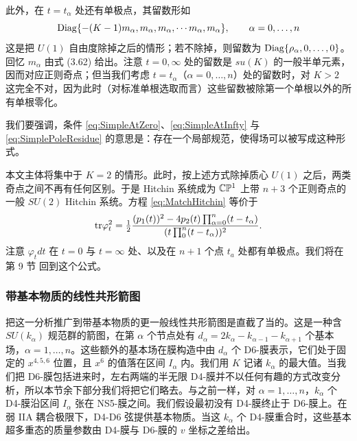 此外，在 $t=t_\alpha$ 处还有单极点，其留数形如
\begin{equation}\label{eq:SimplePoleResidue}
{\rm Diag}\{-(K-1) m_\alpha, m_\alpha,m_\alpha,\cdots m_\alpha,m_\alpha \}  ,\qquad \alpha =
0, \dots, n
\end{equation}
这是把 $U(1)$ 自由度除掉之后的情形；若不除掉，则留数为 ${\rm Diag}\{\rho_\alpha, 0,\dots, 0 \}$。回忆 $m_\alpha$ 由式 (3.62)%
给出。注意 $t=0, \infty$ 处的留数是 $su(K)$ 的一般半单元素，因而对应正则奇点；但当我们考虑 $t=t_\alpha$（$\alpha = 0, \dots, n$）处的留数时，对 $K>2$ 这完全不对，因为此时（对标准单根选取而言）这些留数被除第一个单根以外的所有单根零化。

我们要强调，条件 \eqref{eq:SimpleAtZero}、\eqref{eq:SimpleAtInfty} 与 \eqref{eq:SimplePoleResidue} 的意思是：存在一个局部规范，使得场可以被写成这种形式。

本文主体将集中于 $K=2$ 的情形。此时，按上述方式除掉质心 $U(1)$ 之后，两类奇点之间不再有任何区别。于是 Hitchin 系统成为 $\mathbb{C} \mathbb{P}^1$ 上带 $n+3$ 个正则奇点的一般 $SU(2)$ Hitchin 系统。方程 \eqref{eq:MatchHitchin} 等价于
\begin{equation}\label{eq:su2exple}
{\rm tr} \varphi_t^2 = \tfrac{1}{2} \frac{ (p_1(t))^2 - 4 p_2(t)
\prod_{\alpha=0}^n (t-t_\alpha) }{(t \prod_0^n (t-t_\alpha))^2}.
\end{equation}
注意 $\varphi_t dt$ 在 $t = 0$ 与 $t = \infty$ 处、以及在 $n+1$ 个点 $t_a$ 处都有单极点。我们将在第 9 节%
回到这个公式。

\subsubsection{带基本物质的线性共形箭图}
\label{subsubsec:LinConfQuivMatt}

把这一分析推广到带基本物质的更一般线性共形箭图是直截了当的。这是一种含 $SU(k_\alpha)$ 规范群的箭图，在第 $\alpha$ 个节点处有 $d_\alpha = 2 k_\alpha - k_{\alpha-1} - k_{\alpha + 1}$ 个基本场，$\alpha = 1, \dots, n$。这些额外的基本场在膜构造中由 $d_\alpha$ 个 D6-膜表示，它们处于固定的 $x^{4,5,6}$ 位置，且 $x^6$ 的值落在区间 $I_\alpha$ 内。我们用 $K$ 记诸 $k_\alpha$ 的最大值。当我们把 D6-膜包括进来时，左右两端的半无限 D4-膜并不以任何有趣的方式改变分析，所以本节余下部分我们将把它们略去。与之前一样，对 $\alpha =1,\dots, n$，$k_\alpha$ 个 D4-膜沿区间 $I_\alpha$ 张在 NS5-膜之间。我们假设最初没有 D4-膜终止于 D6-膜上。在弱 IIA 耦合极限下，D4-D6 弦提供基本物质。当这 $k_\alpha$ 个 D4-膜重合时，这些基本超多重态的质量参数由 D4-膜与 D6-膜的 $v$ 坐标之差给出。

